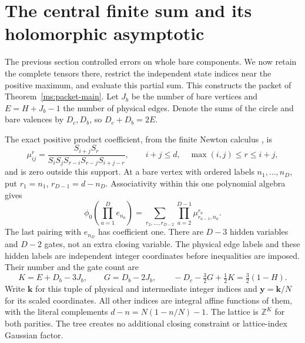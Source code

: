 \section{The central finite sum and its holomorphic asymptotic}\label{ms:packet}
The previous section controlled errors on whole bare components.
We now retain the complete tensors there, restrict the independent
state indices near the positive maximum, and evaluate this partial
sum. This constructs the packet of Theorem~\ref{ms:packet-main}. Let
$J_b$ be the number of bare vertices and $E=H+J_b-1$ the number
of physical edges. Denote the sums of the circle and bare valences
by $D_c,D_b$, so $D_c+D_b=2E$.

The exact positive product coefficient, from the finite Newton
calculus \cite[Theorem 3.3]{Newton}, is
\begin{equation}\label{ms:gate}
 \mu_{ij}^{r}=\frac{S_{i+j}S_r}
 {S_iS_jS_{r-i}S_{r-j}S_{i+j-r}},\qquad
 i+j\le d,\quad\max(i,j)\le r\le i+j,
\end{equation}
and is zero outside this support. At a bare vertex with ordered
labels $n_1,\ldots,n_D$, put $r_1=n_1$, $r_{D-1}=d-n_D$.
Associativity within this one polynomial algebra gives
\begin{equation}\label{ms:resolved-trace}
 \phi_0(\prod_{a=1}^D e_{n_a})
   =\sum_{r_2,\ldots,r_{D-2}}
                   \prod_{a=2}^{D-1}\mu_{r_{a-1},n_a}^{r_a}.
\end{equation}
The last pairing with $e_{n_D}$ has coefficient one. There are
$D-3$ hidden variables and $D-2$ gates, not an extra closing
variable. The physical edge labels and these hidden labels are
independent integer coordinates before inequalities are imposed.
Their number and the gate count are
\begin{equation}\label{ms:dimension}
 K=E+D_b-3J_b,\qquad G=D_b-2J_b,
 \qquad -D_c-\tfrac32G+\tfrac12K=\tfrac32(1-H).
\end{equation}
Write $\mathbf k$ for this tuple of physical and intermediate integer
indices and $\mathbf y=\mathbf k/N$ for its scaled coordinates.
All other indices are integral affine functions of them, with
the literal complements $d-n=N(1-n/N)-1$. The lattice is
$\mathbb Z^K$ for both parities. The tree creates no additional
closing constraint or lattice-index Gaussian factor.


